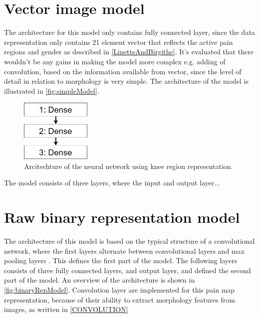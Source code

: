 \section{Vector image model}\label{sec:SimpleRepModel}
The architecture for this model only contains fully connected layer, since the data representation only contains 21 element vector that reflects the active pain regions and gender as described in \autoref{LinetteAndBirgithe}. It's evaluated that there wouldn't be any gains in making the model more complex e.g. adding of convolution, based on the information available from vector, since the level of detail in relation to morphology is very simple. 
The architecture of the model is illustrated in \autoref{fig:simpleModel}. 

\begin{figure} [H]
\centering
\includegraphics[width=0.3\textwidth]{figures/simpleModel}
\caption{Arcitechture of the neural network using knee region representation.}
\label{fig:simpleModel}  
\end{figure}

The model consists of three layers, where the input and output layer... 



\section{Raw binary representation model}\label{sec:BinaryRepModel}
The architecture of this model is based on the typical structure of a convolutional network, where the first layers alternate between convolutional layers and max pooling layers \citep{LeCun2015}. This defines the first part of the model. The following layers consists of three fully connected layers, and output layer, and defined the second part of the model. An overview of the architecture is shown in \autoref{fig:binaryRepModel}.  
Convolution layer are implemented for this pain map representation, because of their ability to extract morphology features from images, as written in \autoref{CONVOLUTION}

